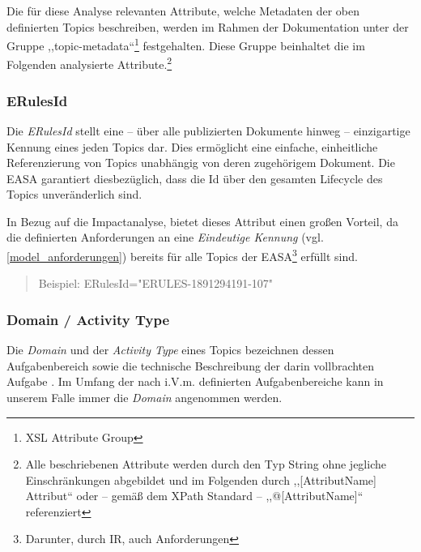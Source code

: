     Die für diese Analyse relevanten Attribute, welche Metadaten der oben definierten Topics beschreiben, werden im Rahmen der Dokumentation unter der Gruppe ,,\textsf{topic-metadata}``\footnote{\ac{XSL} Attribute Group} festgehalten.
    Diese Gruppe beinhaltet die im Folgenden analysierte Attribute.\footnote{Alle beschriebenen Attribute werden durch den Typ String ohne jegliche Einschränkungen abgebildet und im Folgenden durch ,,[AttributName] Attribut`` oder -- gemäß dem XPath Standard -- ,,@[AttributName]`` referenziert} \cite[9]{easa_xml_schema}

\subsubsection{ERulesId}

    Die \textit{ERulesId} stellt eine -- über alle publizierten Dokumente hinweg -- einzigartige Kennung eines jeden Topics dar.
    Dies ermöglicht eine einfache, einheitliche Referenzierung von Topics unabhängig von deren zugehörigem Dokument.
    Die \ac{EASA} garantiert diesbezüglich, dass die Id über den gesamten Lifecycle des Topics unveränderlich sind. \cite[17]{easa_xml_doc}
    
    In Bezug auf die Impactanalyse, bietet dieses Attribut einen großen Vorteil, da die definierten Anforderungen an eine \textit{Eindeutige Kennung} (vgl. \ref{model_anforderungen}) bereits für alle Topics der \ac{EASA}\footnote{Darunter, durch \ac{IR}, auch \atmans Anforderungen} erfüllt sind.
    \begin{quote}
    Beispiel:
    \textsf{ERulesId="{}ERULES-1891294191-107"}
    \end{quote}

    
\subsubsection{Domain / Activity Type}

    Die \textit{Domain} und der \textit{Activity Type} eines Topics bezeichnen dessen Aufgabenbereich sowie die technische Beschreibung der darin vollbrachten Aufgabe \cite[S. 18]{easa_xml_doc}.
    Im Umfang der nach  i.V.m.  definierten Aufgabenbereiche kann in unserem Falle immer die \textit{Domain} \atmans angenommen werden.
    
